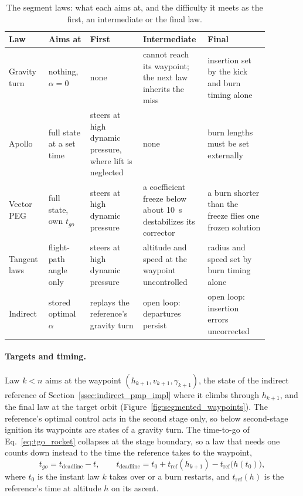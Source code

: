 \begin{table}[htbp]
  \centering
  \caption{The segment laws: what each aims at, and the difficulty it meets as the first,
    an intermediate or the final law.}
  \label{tab:segment_roles}
  \begin{tabular}{p{0.13\linewidth} p{0.15\linewidth} p{0.19\linewidth} p{0.19\linewidth} p{0.22\linewidth}}
    \toprule
    \textbf{Law} & \textbf{Aims at} & \textbf{First} & \textbf{Intermediate} & \textbf{Final} \\
    \midrule
    Gravity turn & nothing, $\alpha = 0$ & none & cannot reach its waypoint; the next law inherits the miss & insertion set by the kick and burn timing alone \\
    Apollo & full state at a set time & steers at high dynamic pressure, where lift is neglected & none & burn lengths must be set externally \\
    Vector PEG & full state, own $t_{go}$ & steers at high dynamic pressure & a coefficient freeze below about \qty{10}{\s} destabilizes its corrector & a burn shorter than the freeze flies one frozen solution \\
    Tangent laws & flight-path angle only & steers at high dynamic pressure & altitude and speed at the waypoint uncontrolled & radius and speed set by burn timing alone \\
    Indirect & stored optimal $\alpha$ & replays the reference's gravity turn & open loop: departures persist & open loop: insertion errors uncorrected \\
    \bottomrule
  \end{tabular}
\end{table}

\paragraph{Targets and timing.}
Law $k < n$ aims at the waypoint $(h_{k+1}, v_{k+1}, \gamma_{k+1})$, the state of the indirect
reference of Section~\ref{ssec:indirect_pmp_impl} where it climbs through $h_{k+1}$, and the final
law at the target orbit (Figure~\ref{fig:segmented_waypoints}). The reference's optimal control
acts in the second stage only, so below second-stage ignition its waypoints are states of a
gravity turn. The time-to-go of Eq.~\eqref{eq:tgo_rocket} collapses at the stage boundary, so a
law that needs one counts down instead to the time the reference takes to the waypoint,
\begin{equation}
  t_{go} = t_{\mathrm{deadline}} - t, \qquad
  t_{\mathrm{deadline}} = t_0 + t_{\mathrm{ref}}(h_{k+1}) - t_{\mathrm{ref}}\bigl(h(t_0)\bigr),
  \label{eq:segment_deadline}
\end{equation}
where $t_0$ is the instant law $k$ takes over or a burn restarts, and $t_{\mathrm{ref}}(h)$ is the
reference's time at altitude $h$ on its ascent.

